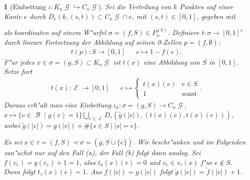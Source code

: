 \documentclass[paper=A4, twoside, chapterprefix=true, bibliography=totoc, headsepline]{scrbook}
\newcommand{\tikzgitter}[3][0.25]{ %
	\draw[step=#1,gray!15] #2 grid #3;
	\draw[step=2*#1,gray!30] #2 grid #3;
	\fill (0,0) circle(0.1); 
}
\DeclareMathOperator{\calB}{{\mathcal{B}}}
\DeclareMathOperator{\calE}{{\mathcal{E}}}
\DeclareMathOperator{\calG}{{\mathcal{G}}}
\newcommand{\E}{\calE}
\newcommand{\G}{\calG}
\theoremstyle{nonumberbreak}
\theoremstyle{emptybreak}
\newtheorem{emptythm}{}%
\theoremstyle{break}
\begin{document}
\begin{emptythm}[Einbettung $\iota: K_n\G \hookrightarrow C_n\G$]
Sei die Verteilung von $k$ Punkten auf einer Kante $e$ durch $D_e(k, (s, t)) \subset C_n\G \cap e$, mit $(s,t) \in [0,1]$, gegeben mit
\begin{center}\end{center}
als koordinaten auf einem W"urfel $\sigma = (f,S) \in P_n^{(k)}$.
Definiere $t: \sigma \to [0,1]^s$ durch lineare Fortsetzung der Abbildung auf seinen 0-Zellen $p= (f, \emptyset)$:
\begin{align*}
	t(p): S \to [0,1] && e \mapsto 1 - f(e).
\end{align*}
F"ur jedes $x \in \sigma = (g,S) \subset K_n\G$ ist  $t(x)$ eine Abbildung von $S$ in $[0,1]$.
Setze fort
\begin{align*}
	t(x): \E \to [0,1] && e \mapsto \begin{cases} t(x)(e) & e \in S \\ 1 & \text{sonst} \end{cases}.
\end{align*}
Daraus erh"alt man eine Einbettung $\iota_\sigma: \sigma = (g, S) \to C_n\G$, $x \mapsto \{v \in \calB \mid g(v) = 1 \} \bigcup_{e \in \E} D_e(\tilde{g}(|e|), (t(x)(\overline e), t(x)(e)))$, wobei $\tilde{g}(|e|) = g(|e|) + \# \{s \in S \mid |s| = e \}$.

Es sei $x \in \tau = (f, S) \prec \sigma = (g, S \dot\cup \{e\})$.
Wir beschr"anken und im Folgenden zun"achst nur auf den Fall (a), der Fall (b) folgt dann analog.
Sei $f(v_e) = g(v_e) + 1 = 1$, also $t_\sigma(x)(e) = 0$ und $v_e \in v_\tau(x)$ f"ur $e \notin S$.
Dann folgt $t_\tau(x)(e) = 1$.
Aus $f(|e|) = g(|e|)$ folgt $\tilde{g}(|e|) = \tilde{f}(|e|) + 1$.


\end{emptythm}
\end{document}
